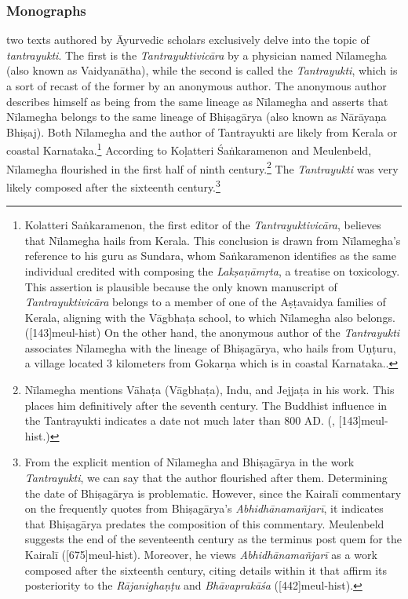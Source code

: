 \subsubsection{Monographs}
two texts authored by Āyurvedic scholars exclusively delve into the topic of \emph{tantrayukti}. The first is the \emph{Tantrayuktivicāra} by a physician named Nīlamegha (also known as Vaidyanātha), while the second is called the \emph{Tantrayukti}, which is a sort of recast of the former by an anonymous author. The anonymous author describes himself as being from the same lineage as Nīlamegha and asserts that Nīlamegha belongs to the same lineage of Bhiṣagārya (also known as Nārāyaṇa Bhiṣaj). Both Nīlamegha and the author of Tantrayukti are likely from Kerala or coastal Karnataka.\footnote{Kolatteri Saṅkaramenon, 
	the first editor of the \emph{Tantrayuktivicāra}, believes that Nīlamegha hails from Kerala. This conclusion is drawn from Nīlamegha's reference to his guru as Sundara, whom Saṅkaramenon identifies as the same individual credited with composing the \emph{Lakṣaṇāmṛta}, a treatise on toxicology. This assertion is plausible because the only known manuscript of \emph{Tantrayuktivicāra} belongs to a member of one of the Aṣṭavaidya families of Kerala, aligning with the Vāgbhaṭa school, to which Nīlamegha also belongs.([143]{meul-hist}) On the other hand, the anonymous author of the \emph{Tantrayukti} associates Nīlamegha with the lineage of Bhiṣagārya, who hails from Uṇṭuru, a village located 3 kilometers from Gokarṇa which is in coastal Karnataka.\parencite[30]{nara-1949}.}
According to Koḷatteri Śaṅkaramenon and Meulenbeld, Nīlamegha flourished in the first half of ninth century.\footnote{Nīlamegha mentions Vāhaṭa (Vāgbhaṭa), Indu, and Jejjaṭa in his work.
	 This places him definitively after the seventh century. The Buddhist influence in the Tantrayukti indicates a date not much later than 800 AD. (\cite[]{muth-1976}, [143]{meul-hist}.)} 
The \emph{Tantrayukti} was very likely composed after the sixteenth century.\footnote{From 
	the explicit mention of Nīlamegha and Bhiṣagārya in the work \emph{Tantrayukti}, we can say that the author flourished after them. Determining the date of Bhiṣagārya is problematic. However, since the Kairalī commentary on the \AHS frequently quotes from Bhiṣagārya's \emph{Abhidhānamañjarī}, it indicates that Bhiṣagārya predates the composition of this commentary. Meulenbeld suggests the end of the seventeenth century as the terminus post quem for the Kairalī ([675]{meul-hist}). Moreover, he views \emph{Abhidhānamañjarī} as a work composed after the sixteenth century, citing details within it that affirm its posteriority to the \emph{Rājanighaṇṭu} and \emph{Bhāvaprakāśa} ([442]{meul-hist}).} 

